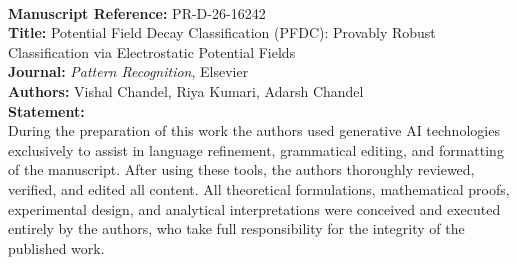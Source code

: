 \documentclass[11pt]{article}
\begin{document}
\\[1em]
\noindent\textbf{Manuscript Reference:} PR-D-26-16242\\
\textbf{Title:} Potential Field Decay Classification (PFDC): Provably Robust Classification via Electrostatic Potential Fields\\
\textbf{Journal:} \textit{Pattern Recognition}, Elsevier\\
\textbf{Authors:} Vishal Chandel, Riya Kumari, Adarsh Chandel\\[1.5em]
\noindent\textbf{Statement:}\\
During the preparation of this work the authors used generative AI technologies exclusively to assist in language refinement, grammatical editing, and formatting of the manuscript. After using these tools, the authors thoroughly reviewed, verified, and edited all content. All theoretical formulations, mathematical proofs, experimental design, and analytical interpretations were conceived and executed entirely by the authors, who take full responsibility for the integrity of the published work.
\end{document}
